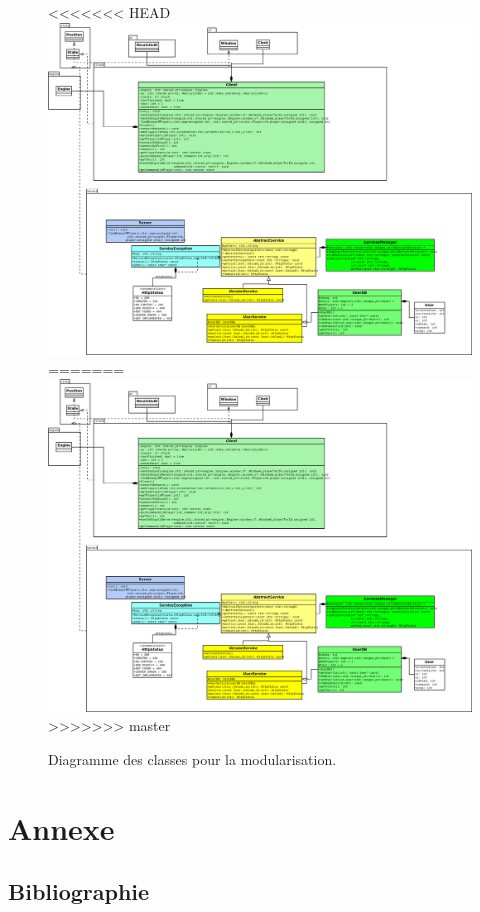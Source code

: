 \documentclass[a4paper,12pt]{article}
\begin{document}
    \begin{landscape}
    \begin{figure}[p]
<<<<<<< HEAD
    \includegraphics[width=0.7\paperheight]{module.png}
=======
    \includegraphics[width=0.8\paperheight]{module.png}
>>>>>>> master
    \caption{\label{uml:module}Diagramme des classes pour la modularisation.}
    \end{figure}
    \end{landscape}
    
    \clearpage
    \section{Annexe}
    \label{sec:Annexe}
    \subsection{Bibliographie}

    
\end{document}
